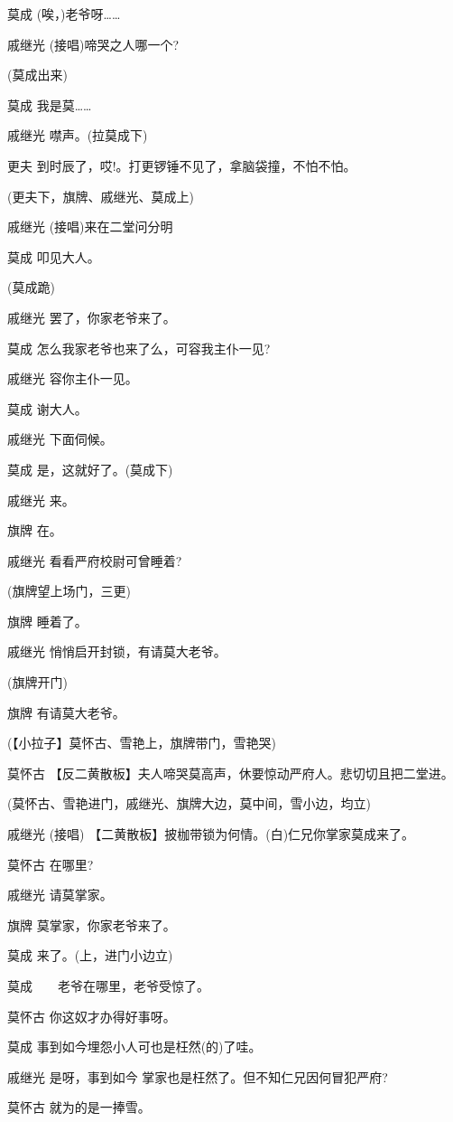 莫成 (唉，)老爷呀\ldots{}\ldots{}

戚继光 (接唱)啼哭之人哪一个?

(莫成出来)

莫成 我是莫\ldots{}\ldots{}

戚继光 噤声。(拉莫成下)

更夫 到时辰了，哎!。打更锣锤不见了，拿脑袋撞，不怕不怕。

(更夫下，旗牌、戚继光、莫成上)

戚继光 (接唱)来在二堂问分明

莫成 叩见大人。

(莫成跪)

戚继光 罢了，你家老爷来了。

莫成 怎么我家老爷也来了么，可容我主仆一见?

戚继光 容你主仆一见。

莫成 谢大人。

戚继光 下面伺候。

莫成 是，这就好了。(莫成下)

戚继光 来。

旗牌 在。

戚继光 看看严府校尉可曾睡着?

(旗牌望上场门，三更)

旗牌 睡着了。

戚继光 悄悄启开封锁，有请莫大老爷。

(旗牌开门)

旗牌 有请莫大老爷。

(【小拉子】莫怀古、雪艳上，旗牌带门，雪艳哭)

莫怀古 【反二黄散板】夫人啼哭莫高声，休要惊动严府人。悲切切且把二堂进。

(莫怀古、雪艳进门，戚继光、旗牌大边，莫中间，雪小边，均立)

戚继光 (接唱) 【二黄散板】披枷带锁为何情。(白)仁兄你掌家莫成来了。

莫怀古 在哪里?

戚继光 请莫掌家。

旗牌 莫掌家，你家老爷来了。

莫成 来了。(上，进门小边立)

莫成　　老爷在哪里，老爷受惊了。

莫怀古 你这奴才办得好事呀。

莫成 事到如今埋怨小人可也是枉然(的)了哇。

戚继光 是呀，事到如今 掌家也是枉然了。但不知仁兄因何冒犯严府?

莫怀古 就为的是一捧雪。

